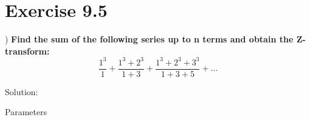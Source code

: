 \documentclass[journal,12pt,twocolumn]{article}
\begin{document}


\vspace{3cm}

\title{}
\author{EE23BTECH11217 - Prajwal M$^{*}$
}
\maketitle
\newpage
\bigskip

\renewcommand{\thefigure}{\theenumi}
\renewcommand{\thetable}{\theenumi}

\section*{Exercise 9.5}
) \hspace{2pt} \textbf{Find the sum of the following series up to n terms and obtain the Z-transform:}
$$ 
\frac{1^3}{1} + \frac{1^3 + 2^3}{1 + 3} + \frac{1^3 + 2^3 + 3^3}{1 + 3 + 5} + \ldots$$

\noindent Solution: 
\fi
\begin{table}[h]
    \centering
    
    \caption{Parameters}
    \label{tab: 11.9.5.25.1}
\end{table}
\end{document}
